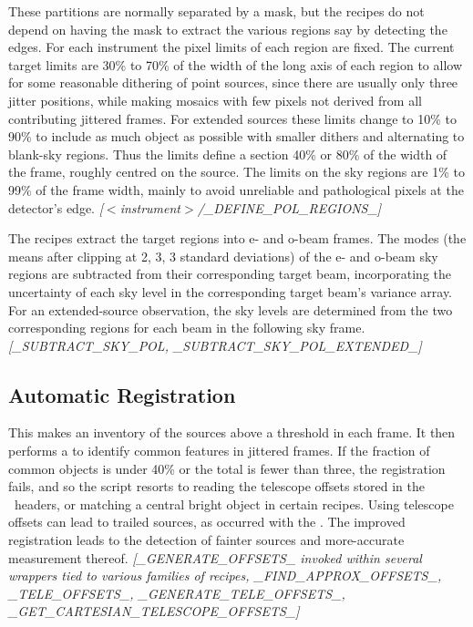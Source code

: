 \documentclass[twoside,11pt,nolof]{starlink}
\providecommand{\FITSref}{\htmladdnormallink{FITS}{http://fits.gsfc.nasa.gov/}}
\begin{document}
These partitions are normally separated by a mask, but the recipes do
not depend on having the mask to extract the various regions say by
detecting the edges.  For each instrument the pixel limits of each
region are fixed.  The current target limits are 30\% to 70\% of the
width of the long axis of each region to allow for some reasonable
dithering of point sources, since there are usually only three jitter
positions, while making mosaics with few pixels not derived from all
contributing jittered frames.  For extended sources these limits
change to 10\% to 90\% to include as much object as possible with
smaller dithers and alternating to blank-sky regions.  Thus the limits
define a section 40\% or 80\% of the width of the frame, roughly
centred on the source.  The limits on the sky regions are 1\% to 99\% of
the frame width, mainly to avoid unreliable and pathological pixels at
the detector's edge.
\newline \emph{[$<$instrument$>$/\_DEFINE\_POL\_REGIONS\_]}

The recipes extract the target regions into e- and o-beam frames.  The
modes (the means after clipping at 2, 3, 3 standard deviations) of the
e- and o-beam sky regions are subtracted from their corresponding
target beam, incorporating the uncertainty of each sky level in the
corresponding target beam's variance array.  For an extended-source
observation, the sky levels are determined from the two corresponding
regions for each beam in the following sky frame.
\newline \emph{[\_SUBTRACT\_SKY\_POL, \_SUBTRACT\_SKY\_POL\_EXTENDED\_]}

\subsection{Automatic
Registration\label{automatic_registration}}

This makes an inventory of the sources above a threshold in each
frame.  It then performs a  to identify common features in
jittered frames.  If the fraction of common objects is under 40\% or
the total is fewer than three, the registration fails, and so the
script resorts to reading the telescope offsets stored in the
\FITSref\ headers, or matching a central bright object in certain
recipes.  Using telescope offsets can lead to trailed sources, as
occurred with the . The
improved registration leads to the detection of fainter sources and
more-accurate measurement thereof.
\newline \emph{[\_GENERATE\_OFFSETS\_ invoked within several wrappers tied to
various families of recipes, \_FIND\_APPROX\_OFFSETS\_, \_TELE\_OFFSETS\_,
\_GENERATE\_TELE\_OFFSETS\_,\\
\_GET\_CARTESIAN\_TELESCOPE\_OFFSETS\_]}
\end{document}
